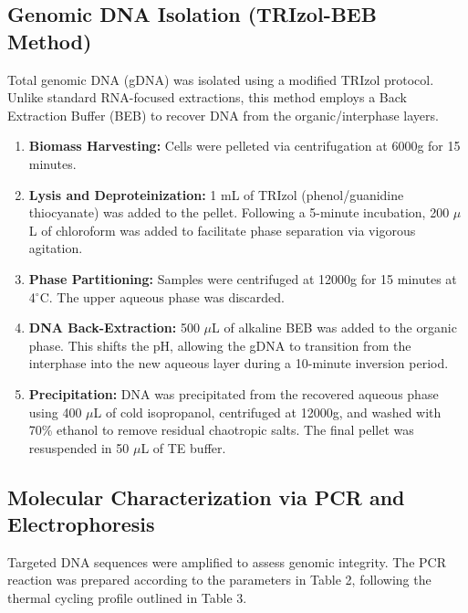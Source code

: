 \documentclass[a4paper]{article}
\begin{document}
\subsection{Genomic DNA Isolation (TRIzol-BEB Method)}
Total genomic DNA (gDNA) was isolated using a modified TRIzol protocol. Unlike standard RNA-focused extractions, this method employs a Back Extraction Buffer (BEB) to recover DNA from the organic/interphase layers.
\begin{enumerate}
    \item \textbf{Biomass Harvesting:} Cells were pelleted via centrifugation at 6000g for 15 minutes.
    \item \textbf{Lysis and Deproteinization:} 1 mL of TRIzol (phenol/guanidine thiocyanate) was added to the pellet. Following a 5-minute incubation, 200 $\mu$L of chloroform was added to facilitate phase separation via vigorous agitation.
    \item \textbf{Phase Partitioning:} Samples were centrifuged at 12000g for 15 minutes at 4$^\circ$C. The upper aqueous phase was discarded. 
    \item \textbf{DNA Back-Extraction:} 500 $\mu$L of alkaline BEB was added to the organic phase. This shifts the pH, allowing the gDNA to transition from the interphase into the new aqueous layer during a 10-minute inversion period.
    \item \textbf{Precipitation:} DNA was precipitated from the recovered aqueous phase using 400 $\mu$L of cold isopropanol, centrifuged at 12000g, and washed with 70\% ethanol to remove residual chaotropic salts. The final pellet was resuspended in 50 $\mu$L of TE buffer.
\end{enumerate}

\subsection{Molecular Characterization via PCR and Electrophoresis}
Targeted DNA sequences were amplified to assess genomic integrity. The PCR reaction was prepared according to the parameters in Table 2, following the thermal cycling profile outlined in Table 3.
\end{document}
